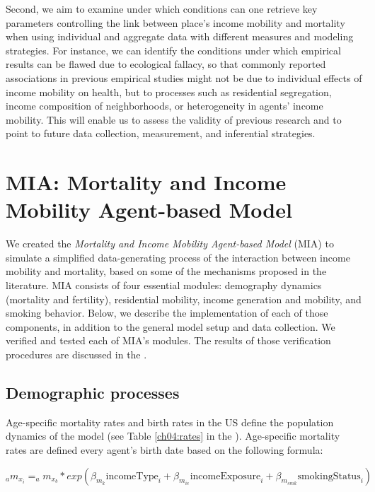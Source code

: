\documentclass[class=article, crop=false, 12pt]{standalone}
\begin{document}
Second, we aim to examine under which conditions can one retrieve key parameters controlling the link between place's income mobility and mortality when using individual and aggregate data with different measures and modeling strategies. For instance, we can identify the conditions under which empirical results can be flawed due to ecological fallacy, so that commonly reported associations in previous empirical studies might not be due to individual effects of income mobility on health, but to processes such as residential segregation, income composition of neighborhoods, or heterogeneity in agents' income mobility. This will enable us to assess the validity of previous research and to point to future data collection, measurement, and inferential strategies.

\section{MIA: Mortality and Income Mobility Agent-based Model} \label{ch04:abm}

We created the \textit{Mortality and Income Mobility Agent-based Model} (MIA) to simulate a simplified data-generating process of the interaction between income mobility and mortality, based on some of the mechanisms proposed in the literature. MIA consists of four essential modules: demography dynamics (mortality and fertility), residential mobility, income generation and mobility, and smoking behavior. Below, we describe the implementation of each of those components, in addition to the general model setup and data collection. We verified and tested each of MIA's modules. The results of those verification procedures are discussed in the \textit{}.

\subsection{Demographic processes}

Age-specific mortality rates and birth rates in the US define the population dynamics of the model (see Table \ref{ch04:rates} in the \textit{}). Age-specific mortality rates are defined every agent's birth date based on the following formula: 

\vspace{-10pt}
\begin{equation}\label{ch04:eq_mortality}
    _{a}m_{x_i} = _am_{x_{b}} * exp(
    \beta_{m_{k}} \text{incomeType}_i +
    \beta_{m_{ie}} \text{incomeExposure}_i +
    \beta_{m_{smk}} \text{smokingStatus}_i )
\end{equation}
\end{document}
